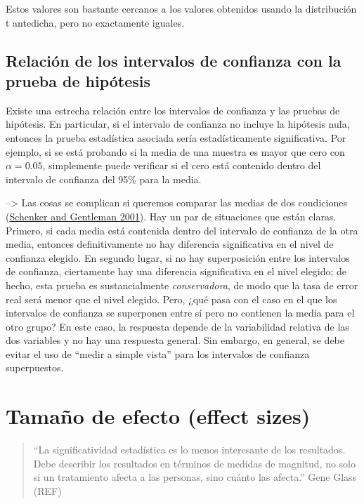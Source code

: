 \documentclass[
  12pt,
]{book}
\begin{document}
Estos valores son bastante cercanos a los valores obtenidos usando la distribución t antedicha, pero no exactamente iguales.

\hypertarget{relaciuxf3n-de-los-intervalos-de-confianza-con-la-prueba-de-hipuxf3tesis}{%
\subsection{Relación de los intervalos de confianza con la prueba de hipótesis}\label{relaciuxf3n-de-los-intervalos-de-confianza-con-la-prueba-de-hipuxf3tesis}}

Existe una estrecha relación entre los intervalos de confianza y las pruebas de hipótesis. En particular, si el intervalo de confianza no incluye la hipótesis nula, entonces la prueba estadística asociada sería estadísticamente significativa. Por ejemplo, si se está probando si la media de una muestra es mayor que cero con \(\alpha = 0.05\), simplemente puede verificar si el cero está contenido dentro del intervalo de confianza del 95\% para la media.

--\textgreater{}
Las cosas se complican si queremos comparar las medias de dos condiciones (\protect\hyperlink{ref-sche:gent:2001}{Schenker and Gentleman 2001}). Hay un par de situaciones que están claras. Primero, si cada media está contenida dentro del intervalo de confianza de la otra media, entonces definitivamente no hay diferencia significativa en el nivel de confianza elegido. En segundo lugar, si no hay superposición entre los intervalos de confianza, ciertamente hay una diferencia significativa en el nivel elegido; de hecho, esta prueba es sustancialmente \emph{conservadora}, de modo que la tasa de error real será menor que el nivel elegido. Pero, ¿qué pasa con el caso en el que los intervalos de confianza se superponen entre sí pero no contienen la media para el otro grupo? En este caso, la respuesta depende de la variabilidad relativa de las dos variables y no hay una respuesta general. Sin embargo, en general, se debe evitar el uso de ``medir a simple vista'' para los intervalos de confianza superpuestos.

\hypertarget{tamauxf1o-de-efecto-effect-sizes}{%
\section{Tamaño de efecto (effect sizes)}\label{tamauxf1o-de-efecto-effect-sizes}}

\begin{quote}
``La significatividad estadística es lo menos interesante de los resultados. Debe describir los resultados en términos de medidas de magnitud, no solo si un tratamiento afecta a las personas, sino cuánto las afecta.'' Gene Glass (REF)
\end{quote}
\end{document}
